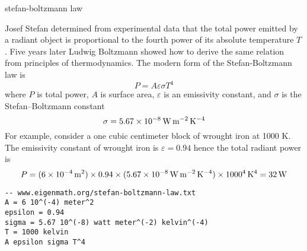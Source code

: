 \documentclass[12pt]{article}
\begin{document}
\begin{center}
{\sc stefan-boltzmann law}
\end{center}

\noindent
Josef Stefan determined from experimental data that the total power
emitted by a radiant object is proportional
to the fourth power of its absolute temperature $T$.
Five years later Ludwig Boltzmann showed how to derive the same relation from principles of thermodynamics.
The modern form of the Stefan-Boltzmann law is
$$
P=A\varepsilon\sigma T^4
$$
where $P$ is total power, $A$ is surface area, $\varepsilon$ is an emissivity constant,
and $\sigma$ is the Stefan--Boltzmann constant
$$
\sigma=5.67\times10^{-8}\,{\rm W}\,{\rm m}^{-2}\,{\rm K}^{-4}
$$
For example, consider a one cubic centimeter block of wrought iron at 1000 K.
The emissivity constant of wrought iron is $\varepsilon=0.94$
hence the total radiant power is
$$
P=(6\times10^{-4}\,{\rm m}^2)\times0.94\times
(5.67\times10^{-8}\,{\rm W}\,{\rm m}^{-2}\,{\rm K}^{-4})
\times1000^4\,{\rm K}^4
=32\,{\rm W}
$$
\begin{Verbatim}[formatcom=\color{blue}]
-- www.eigenmath.org/stefan-boltzmann-law.txt
A = 6 10^(-4) meter^2
epsilon = 0.94
sigma = 5.67 10^(-8) watt meter^(-2) kelvin^(-4)
T = 1000 kelvin
A epsilon sigma T^4
\end{Verbatim}
\end{document}

